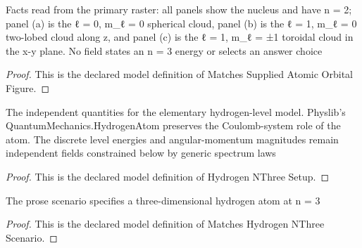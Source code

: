 \begin{definition}
  \label{def:physics:phyx-mini-0620:phyxminiproblems-problemphyxmini0620-matchessuppliedatomicorbitalfigure}
  Facts read from the primary raster: all panels show the nucleus and have n = 2; panel (a) is the ℓ = 0, m\_ℓ = 0 spherical cloud, panel (b) is the ℓ = 1, m\_ℓ = 0 two-lobed cloud along z, and panel (c) is the ℓ = 1, m\_ℓ = ±1 toroidal cloud in the x-y plane. No field states an n = 3 energy or selects an answer choice
\end{definition}
\begin{proof}
  This is the declared model definition of Matches Supplied Atomic Orbital Figure.
\end{proof}
\begin{definition}
  \label{def:physics:phyx-mini-0620:phyxminiproblems-problemphyxmini0620-hydrogennthreesetup}
  The independent quantities for the elementary hydrogen-level model. Physlib's QuantumMechanics.HydrogenAtom preserves the Coulomb-system role of the atom. The discrete level energies and angular-momentum magnitudes remain independent fields constrained below by generic spectrum laws
\end{definition}
\begin{proof}
  This is the declared model definition of Hydrogen NThree Setup.
\end{proof}
\begin{definition}
  \label{def:physics:phyx-mini-0620:phyxminiproblems-problemphyxmini0620-matcheshydrogennthreescenario}
  The prose scenario specifies a three-dimensional hydrogen atom at n = 3
\end{definition}
\begin{proof}
  This is the declared model definition of Matches Hydrogen NThree Scenario.
\end{proof}

